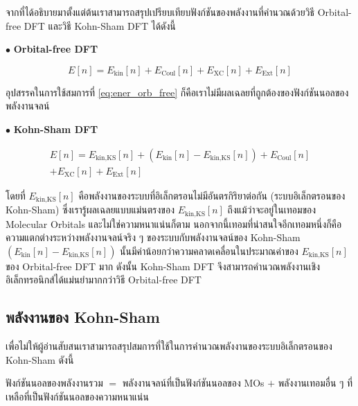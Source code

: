 จากที่ได้อธิบายมาตั้งแต่ต้นเราสามารถสรุปเปรียบเทียบฟังก์ชันของพลังงานที่คำนวณด้วยวิธี Orbital-free DFT และวิธี Kohn-Sham DFT ได้ดังนี้

\noindent $\bullet$ \textbf{Orbital-free DFT}

\begin{equation}\label{eq:ener_orb_free}
    E[n] = E_{\text{kin}}[n] + E_{\text{Coul}}[n] + E_{\text{XC}}[n] + E_{\text{Ext}}[n]
\end{equation}

\noindent อุปสรรคในการใช้สมการที่ \eqref{eq:ener_orb_free} ก็คือเราไม่มีผลเฉลยที่ถูกต้องของฟังก์ชันนอลของพลังงานจลน์

\noindent $\bullet$ \textbf{Kohn-Sham DFT}

\begin{multline}\label{eq:ener_kohn_sham}
    E[n] = E_{\text{kin,KS}}[n] + (E_{\text{kin}}[n] - E_{\text{kin,KS}}[n]) + E_{\text{Coul}}[n] \\
    + E_{\text{XC}}[n] + E_{\text{Ext}}[n]
\end{multline}

\noindent โดยที่ $E_{\text{kin,KS}}[n]$ คือพลังงานของระบบที่อิเล็กตรอนไม่มีอันตรกิริยาต่อกัน (ระบบอิเล็กตรอนของ Kohn-Sham)
ซึ่งเรารู้ผลเฉลยแบบแม่นตรงของ $E_{\text{kin,KS}}[n]$ ถึงแม้ว่าจะอยู่ในเทอมของ Molecular Orbitals และไม่ใช่ความหนาแน่นก็ตาม
นอกจากนี้เทอมที่น่าสนใจอีกเทอมหนึ่งก็คือความแตกต่างระหว่างพลังงานจลน์จริง ๆ ของระบบกับพลังงานจลน์ของ Kohn-Sham
$(E_{\text{kin}}[n] - E_{\text{kin,KS}}[n])$ นั้นมีค่าน้อยกว่าความคลาดเคลื่อนในประมาณค่าของ $E_{\text{kin,KS}}[n]$ ของ
Orbital-free DFT มาก ดังนั้น Kohn-Sham DFT จึงสามารถคำนวณพลังงานเชิงอิเล็กทรอนิกส์ได้แม่นยำมากกว่าวิธี Orbital-free DFT

\subsection{พลังงานของ Kohn-Sham}
\label{ssec:kohn_sham_ener_expr}

เพื่อไม่ให้ผู้อ่านสับสนเราสามารถสรุปสมการที่ใช้ในการคำนวณพลังงานของระบบอิเล็กตรอนของ Kohn-Sham ดังนี้

\begin{framed}
    ฟังก์ชันนอลของพลังงานรวม $=$ พลังงานจลน์ที่เป็นฟังก์ชันนอลของ MOs $+$ พลังงานเทอมอื่น ๆ ที่เหลือที่เป็นฟังก์ชันนอลของความหนาแน่น
\end{framed}


